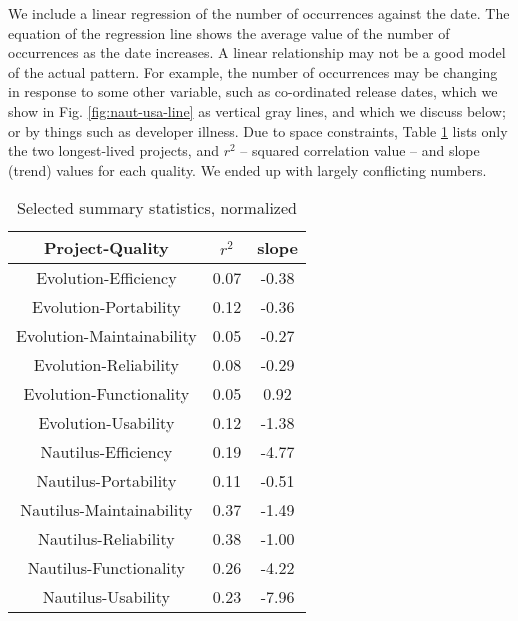 \documentclass[conference, compsoc]{IEEEtran}
\begin{document}
We include a linear regression of the number of occurrences against the date. The equation of the regression line shows the average value of the number of occurrences as the date increases. A linear relationship may not be a good model of the actual pattern. For example, the number of occurrences may be changing in response to some other variable, such as co-ordinated release dates, which we show in Fig. \ref{fig:naut-usa-line} as vertical gray lines, and which we discuss below; or by things such as developer illness. Due to space constraints, Table \ref{tbl:summary} lists only the two longest-lived projects, and $r^2$  -- squared correlation value -- and slope (trend) values for each quality. We ended up with largely conflicting numbers. 

\begin{table}
	\caption{Selected summary statistics, normalized}
	\centering
	\label{tbl:summary}
\begin{tabular}{|c|c|c|}
\hline
\rowcolor[gray]{.9} 
Project-Quality &  $r^2$ &  slope \\ \hline
Evolution-Efficiency & 0.07 & -0.38 \\
Evolution-Portability & 0.12 & -0.36 \\
Evolution-Maintainability & 0.05 & -0.27 \\
Evolution-Reliability & 0.08 & -0.29 \\
Evolution-Functionality & 0.05 & 0.92 \\
Evolution-Usability & 0.12 & -1.38 \\
Nautilus-Efficiency & 0.19 & -4.77 \\
Nautilus-Portability & 0.11 & -0.51 \\
Nautilus-Maintainability & 0.37 & -1.49 \\
Nautilus-Reliability & 0.38 & -1.00 \\
Nautilus-Functionality & 0.26 & -4.22 \\
Nautilus-Usability & 0.23 & -7.96 \\
\hline
\end{tabular}
\end{table}
\end{document}
